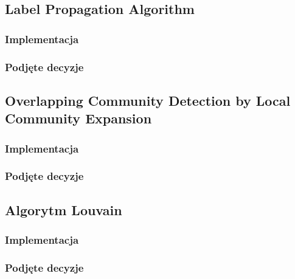 \documentclass{article}
\begin{document}
\subsection{Label Propagation Algorithm}
\subsubsection{Implementacja}
\subsubsection{Podjęte decyzje}


\subsection{Overlapping Community Detection by Local Community Expansion}
\subsubsection{Implementacja}
\subsubsection{Podjęte decyzje}

\subsection{Algorytm Louvain}
\subsubsection{Implementacja}
\subsubsection{Podjęte decyzje}

\end{document}
